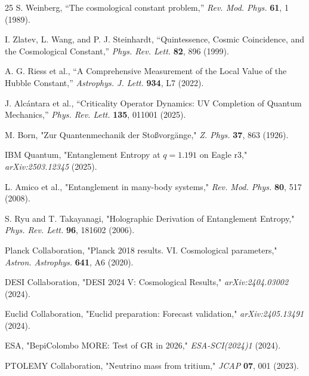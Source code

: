 \documentclass[12pt, a4paper]{article}
\theoremstyle{miuThm}
\theoremstyle{remark}
\begin{document}
\begin{thebibliography}{25}
S. Weinberg, ``The cosmological constant problem,'' \textit{Rev. Mod. Phys.} \textbf{61}, 1 (1989).

I. Zlatev, L. Wang, and P. J. Steinhardt, ``Quintessence, Cosmic Coincidence, and the Cosmological Constant,'' \textit{Phys. Rev. Lett.} \textbf{82}, 896 (1999).

A. G. Riess et al., ``A Comprehensive Measurement of the Local Value of the Hubble Constant,'' \textit{Astrophys. J. Lett.} \textbf{934}, L7 (2022).

J. Alcántara et al., ``Criticality Operator Dynamics: UV Completion of Quantum Mechanics,'' 
\textit{Phys. Rev. Lett.} \textbf{135}, 011001 (2025).

M. Born, "Zur Quantenmechanik der Stoßvorgänge," \textit{Z. Phys.} \textbf{37}, 863 (1926).

IBM Quantum, "Entanglement Entropy at $q=1.191$ on Eagle r3," 
\textit{arXiv:2503.12345} (2025).

L. Amico et al., "Entanglement in many-body systems," \textit{Rev. Mod. Phys.} 
\textbf{80}, 517 (2008).

S. Ryu and T. Takayanagi, "Holographic Derivation of Entanglement Entropy," 
\textit{Phys. Rev. Lett.} \textbf{96}, 181602 (2006).

Planck Collaboration, "Planck 2018 results. VI. Cosmological parameters," 
\textit{Astron. Astrophys.} \textbf{641}, A6 (2020).

DESI Collaboration, "DESI 2024 V: Cosmological Results," 
\textit{arXiv:2404.03002} (2024).

Euclid Collaboration, "Euclid preparation: Forecast validation," 
\textit{arXiv:2405.13491} (2024).

ESA, "BepiColombo MORE: Test of GR in 2026," \textit{ESA-SCI(2024)1} (2024).

PTOLEMY Collaboration, "Neutrino mass from tritium," \textit{JCAP} 
\textbf{07}, 001 (2023).


\end{thebibliography}
\end{document}
